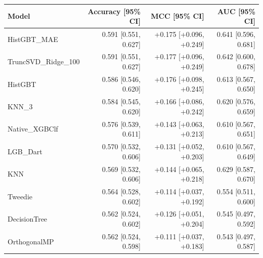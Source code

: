\begin{tabular}{lrrr}
\toprule
Model & Accuracy [95\% CI] & MCC [95\% CI] & AUC [95\% CI] \\
\midrule
HistGBT\_MAE & 0.591 [0.551, 0.627] & +0.175 [+0.096, +0.249] & 0.641 [0.596, 0.681] \\
TruncSVD\_Ridge\_100 & 0.591 [0.551, 0.627] & +0.177 [+0.096, +0.249] & 0.642 [0.600, 0.678] \\
HistGBT & 0.586 [0.546, 0.620] & +0.176 [+0.098, +0.245] & 0.613 [0.567, 0.650] \\
KNN\_3 & 0.584 [0.545, 0.620] & +0.166 [+0.086, +0.242] & 0.620 [0.576, 0.659] \\
Native\_XGBClf & 0.576 [0.539, 0.611] & +0.143 [+0.063, +0.213] & 0.610 [0.567, 0.651] \\
LGB\_Dart & 0.570 [0.532, 0.606] & +0.131 [+0.052, +0.203] & 0.610 [0.567, 0.649] \\
KNN & 0.569 [0.532, 0.606] & +0.144 [+0.065, +0.218] & 0.629 [0.587, 0.670] \\
Tweedie & 0.564 [0.528, 0.602] & +0.114 [+0.037, +0.192] & 0.554 [0.511, 0.600] \\
DecisionTree & 0.562 [0.524, 0.602] & +0.126 [+0.051, +0.204] & 0.545 [0.497, 0.592] \\
OrthogonalMP & 0.562 [0.524, 0.598] & +0.111 [+0.037, +0.183] & 0.543 [0.497, 0.587] \\
\bottomrule
\end{tabular}